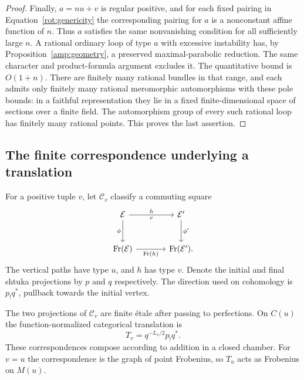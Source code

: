 \begin{proof}
Finally, $a=nu+v$ is regular positive, and for each fixed pairing in
Equation~\eqref{rot:genericity} the corresponding pairing for $a$ is a
nonconstant affine function of $n$.  Thus $a$ satisfies the same
nonvanishing condition for all sufficiently large $n$.  A rational
ordinary loop of type $a$ with excessive instability has, by
Proposition~\ref{amp:geometry}, a preserved maximal-parabolic reduction.
The same character and product-formula argument excludes it.  The
quantitative bound is $O(1+n)$.  There are finitely many rational bundles
in that range, and each admits only finitely many rational
meromorphic automorphisms with these pole bounds: in a faithful
representation they lie in a fixed finite-dimensional space of
sections over a finite field.  The automorphism group of every such
rational loop has finitely many rational points.  This proves the
last assertion.
\end{proof}

\subsection{The finite correspondence underlying a translation}

For a positive tuple $v$, let $\mathcal C_v$ classify a commuting square
\[
\begin{tikzcd}[column sep=large,row sep=large]
 \mathcal E \arrow[r,"h", "v"'] \arrow[d,"\phi"'] &
 \mathcal E' \arrow[d,"\phi'"] \\
 \mathrm{Fr}(\mathcal E) \arrow[r,"\mathrm{Fr}(h)"'] &
 \mathrm{Fr}(\mathcal E').
\end{tikzcd}
\]
The vertical paths have type $u$, and $h$ has type $v$.  Denote the
initial and final shtuka projections by $p$ and $q$ respectively.
The direction used on cohomology is $p_!q^*$, pullback towards the
initial vertex.

\begin{lemma}\label{rot:finite-correspondence}
The two projections of $\mathcal C_v$ are finite \'etale after passing
to perfections.  On $C(u)$ the function-normalized categorical
translation is
\begin{equation}\label{rot:geometric-operator}
 T_v=q^{-L_v/2}p_!q^*.
\end{equation}
These correspondences compose according to addition in a closed
chamber.  For $v=u$ the correspondence is the graph of point
Frobenius, so $T_u$ acts as Frobenius on $M(u)$.
\end{lemma}

